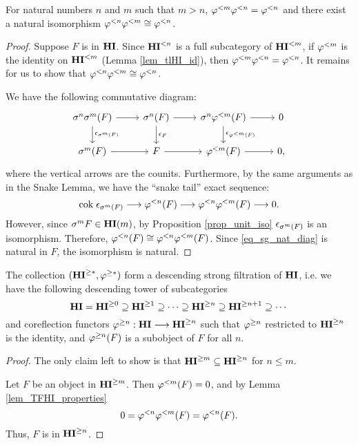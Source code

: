 \begin{lem}\label{lem_TFHI_properties}
For natural numbers $n$ and $m$ such that $m > n$, $\tlHI{m} 
\tlHI{n} = \tlHI{n}$ and there exist a
natural isomorphism $\tlHI{n}\tlHI{m} \cong \tlHI{n}$. 
\end{lem}
\begin{proof}
Suppose $F$ is in $\HI$. Since $\TFHI{n}$ is a
full subcategory of $\TFHI{m}$, if $\tlHI{m}$ is the identity on 
$\TFHI{m}$ (Lemma \ref{lem_tlHI_id}), then $\tlHI{m}\tlHI{n} = 
\tlHI{n}$. It remains for us to show that $\tlHI{n}\tlHI{m} \cong
\tlHI{n}$.

We have the following commutative diagram:
\begin{equation}\label{eq_sg_nat_diag}
\begin{tikzcd}
\sgHI{n}\sgHI{m}(F) \arrow{r}\arrow{d}{\cuHI_{\sgHI{m}(F)}} &
\sgHI{n}(F) \arrow{r}\arrow{d}{\cuHI_F} &
\sgHI{n}\tlHI{m}(F) \arrow{r}\arrow{d}{\cuHI_{\tlHI{m}(F)}} &
0 \\
\sgHI{m}(F) \arrow{r} &
F \arrow{r} &
\tlHI{m}(F) \arrow{r}&
0,
\end{tikzcd}
\end{equation}
where the vertical arrows are the counits. Furthermore, by the 
same arguments as in the Snake Lemma, we have the ``snake tail'' 
exact sequence:
\[
\cok \cuHI_{\sgHI{m}(F)} \to \tlHI{n}(F) \to \tlHI{n}\tlHI{m}(F) 
   \to 0.
\]
However, since $\sgHI{m}F \in \LHI[m]{\HI}$, by Proposition
\ref{prop_unit_iso} $\cuHI_{\sgHI{m}(F)}$ is an isomorphism. 
Therefore, $\tlHI{n}(F) \cong \tlHI{n}\tlHI{m}(F)$. Since
\eqref{eq_sg_nat_diag} is natural in $F$, the isomorphism is
natural.
\end{proof}

\begin{prop}\label{prop_THI_form_strong_filt}
The collection $(\THI{*}, \tgHI{*})$ form a descending strong 
filtration of $\HI$, i.e. we have the following descending
tower of subcategories
\[
\HI = \THI{0} \supseteq \THI{1} \supseteq \cdots \supseteq \THI{n} \supseteq \THI{n + 1}
\supseteq \cdots
\]
and coreflection functors $\tgHI{n} : \HI \to \THI{n}$ such
that $\tgHI{n}$ restricted to $\THI{n}$ is the identity, and
$\tgHI{n}(F)$ is a subobject of $F$ for all $n$.
\end{prop}
\begin{proof}
The only claim left to show is that $\THI{m} \subseteq \THI{n}$
for $n \leq m$.

Let $F$ be an object in $\THI{m}$. Then 
$\tlHI{m}(F) = 0$, and by Lemma \ref{lem_TFHI_properties}
\[
0 = \tlHI{n}\tlHI{m}(F) = \tlHI{n}(F).
\]
Thus, $F$ is in $\THI{n}$.
\end{proof}

